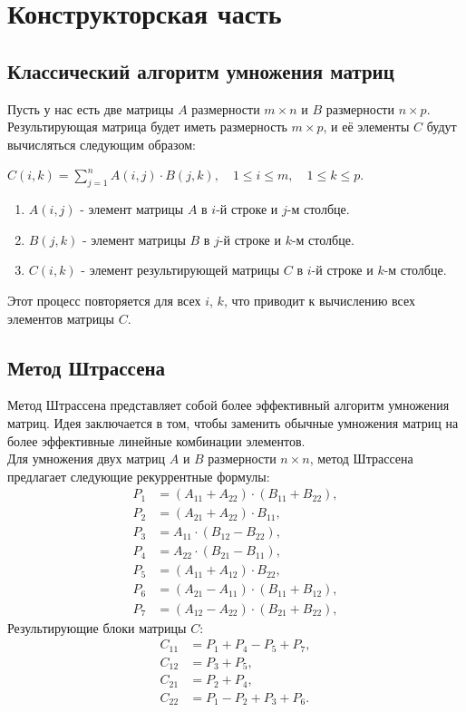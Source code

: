 \documentclass[12pt, a4paper]{article}
\begin{document}
\newpage
\section{Конструкторская часть}
\subsection{Классический алгоритм умножения матриц}
Пусть у нас есть две матрицы $A$ размерности $m \times n$ и $B$ 
размерности $n \times p$. Результирующая матрица будет иметь размерность $
m \times p$, и её элементы $C$ будут вычисляться следующим образом:

$C(i, k) = \sum_{j=1}^{n} A(i, j) \cdot B(j, k), \quad 1 \leq i \leq m, \quad 1 \leq k \leq p$.
\begin{enumerate}
    \item $A(i, j)$ - элемент матрицы $A$ в $i$-й строке и $j$-м столбце.
    \item $B(j, k)$ - элемент матрицы $B$ в $j$-й строке и $k$-м столбце.
    \item $C(i, k)$ - элемент результирующей матрицы $C$ в $i$-й строке и 
    $k$-м столбце.
\end{enumerate}
Этот процесс повторяется для всех $i$, $k$, что приводит к вычислению всех 
элементов матрицы $C$.
\subsection{Метод Штрассена}
Метод Штрассена представляет собой более эффективный алгоритм умножения матриц. 
Идея заключается в том, чтобы заменить обычные умножения матриц на более 
эффективные линейные комбинации элементов.\\
Для умножения двух матриц $A$ и $B$ размерности $n \times n$, метод Штрассена 
предлагает следующие рекуррентные формулы:
\[
\begin{aligned}
P_1 &= (A_{11} + A_{22}) \cdot (B_{11} + B_{22}), \\
P_2 &= (A_{21} + A_{22}) \cdot B_{11}, \\
P_3 &= A_{11} \cdot (B_{12} - B_{22}), \\
P_4 &= A_{22} \cdot (B_{21} - B_{11}), \\
P_5 &= (A_{11} + A_{12}) \cdot B_{22}, \\
P_6 &= (A_{21} - A_{11}) \cdot (B_{11} + B_{12}), \\
P_7 &= (A_{12} - A_{22}) \cdot (B_{21} + B_{22}),
\end{aligned}
\]
Результирующие блоки матрицы $C$:
\[
\begin{aligned}
C_{11} &= P_1 + P_4 - P_5 + P_7, \\
C_{12} &= P_3 + P_5, \\
C_{21} &= P_2 + P_4, \\
C_{22} &= P_1 - P_2 + P_3 + P_6.
\end{aligned}
\]
\end{document}
